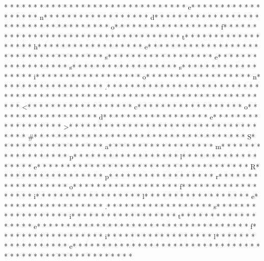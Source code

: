 *  * * *  *  * * *  *  * * *  *  * * *  * * *  * * *  *  * * *  *  * * *  * e* * *  * * *  * * *  *  * * *  *  * * *  * n* * *  * * *  * * *  *  * * *  *  * * *  * d* * *  * * *  * * *  *  * * *  *  * * *  *  * * *  * * *  * * *  *  * * *  *  * * *  * o* * *  * * *  * * *  *  * * *  *  * * *  * f* * *  * * *  * * *  *  * * *  *  * * *  *  * * *  * * *  * * *  *  * * *  *  * * *  * t* * *  * * *  * * *  *  * * *  *  * * *  * h* * *  * * *  * * *  *  * * *  *  * * *  * e* * *  * * *  * * *  *  * * *  *  * * *  *  * * *  * * *  * * *  *  * * *  *  * * *  * s* * *  * * *  * * *  *  * * *  *  * * *  * e* * *  * * *  * * *  *  * * *  *  * * *  * s* * *  * * *  * * *  *  * * *  *  * * *  * s* * *  * * *  * * *  *  * * *  *  * * *  * i* * *  * * *  * * *  *  * * *  *  * * *  * o* * *  * * *  * * *  *  * * *  *  * * *  * n* * *  * * *  * * *  *  * * *  *  * * *  * .* * *  * * *  * * *  *  * * *  *  * * *  *  * * *  * * *  * * *  *  * * *  *  * * *  * 
* * *  * * *  * * *  *  * * *  *  * * *  * 
* * *  * * *  * * *  *  * * *  *  * * *  * <* * *  * * *  * * *  *  * * *  *  * * *  * c* * *  * * *  * * *  *  * * *  *  * * *  * o* * *  * * *  * * *  *  * * *  *  * * *  * d* * *  * * *  * * *  *  * * *  *  * * *  * e* * *  * * *  * * *  *  * * *  *  * * *  * >* * *  * * *  * * *  *  * * *  *  * * *  * 
* * *  * * *  * * *  *  * * *  *  * * *  * #* * *  * * *  * * *  *  * * *  *  * * *  *  * * *  * * *  * * *  *  * * *  *  * * *  * S* * *  * * *  * * *  *  * * *  *  * * *  * a* * *  * * *  * * *  *  * * *  *  * * *  * m* * *  * * *  * * *  *  * * *  *  * * *  * p* * *  * * *  * * *  *  * * *  *  * * *  * l* * *  * * *  * * *  *  * * *  *  * * *  * e* * *  * * *  * * *  *  * * *  *  * * *  *  * * *  * * *  * * *  *  * * *  *  * * *  * R* * *  * * *  * * *  *  * * *  *  * * *  * p* * *  * * *  * * *  *  * * *  *  * * *  * r* * *  * * *  * * *  *  * * *  *  * * *  * o* * *  * * *  * * *  *  * * *  *  * * *  * f* * *  * * *  * * *  *  * * *  *  * * *  * i* * *  * * *  * * *  *  * * *  *  * * *  * l* * *  * * *  * * *  *  * * *  *  * * *  * e* * *  * * *  * * *  *  * * *  *  * * *  * .* * *  * * *  * * *  *  * * *  *  * * *  * s* * *  * * *  * * *  *  * * *  *  * * *  * i* * *  * * *  * * *  *  * * *  *  * * *  * t* * *  * * *  * * *  *  * * *  *  * * *  * e* * *  * * *  * * *  *  * * *  *  * * *  *  * * *  * * *  * * *  *  * * *  *  * * *  * f* * *  * * *  * * *  *  * * *  *  * * *  * i* * *  * * *  * * *  *  * * *  *  * * *  * l* * *  * * *  * * *  *  * * *  *  * * *  * e* * *  * * *  * * *  *  * * *  *  * * *  *  * * *  * * *  * * *  *  * * *  *  * * *  * 
* * *  * * *  * * *  *  * * *  *  * * *  * 
